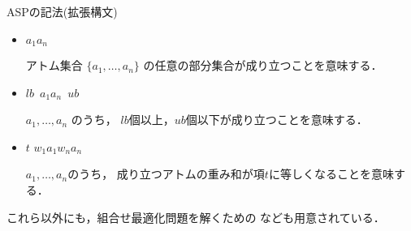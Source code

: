 \documentclass[dvipdfmx, 11pt]{beamer}
\begin{document}
\begin{frame}{ASPの記法(拡張構文)}
 \begin{itemize}
  \item {}
	\begin{center}
	 \code{\{}$a_1$$a_n$\code{\}}
	\end{center}
	アトム集合 $\{a_1,\dots,a_n\}$
	の任意の部分集合が成り立つことを意味する．
  \item {}
	\begin{center}
	 $lb$\ \code{\{}$a_1$$a_n$\code{\}}\ $ub$
	\end{center}
	$a_1,\dots,a_n$ のうち，
	$lb$個以上，$ub$個以下が成り立つことを意味する．
  \item {}
	\begin{center}
	 $t$  \code{\{} $w_1$\code{:}$a_1$$w_n$\code{:}$a_n$ \code{\}}
	\end{center}
	$a_1,\dots,a_n$のうち，
	成り立つアトムの重み和が項$t$に等しくなることを意味する．
 \end{itemize}
 これら以外にも，組合せ最適化問題を解くための
 なども用意されている．
\end{frame}
\end{document}
